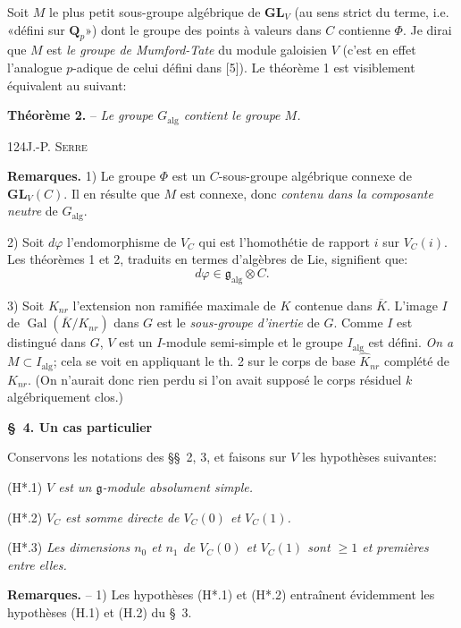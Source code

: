 Soit $M$ le plus petit sous-groupe algébrique de $\mathbf{GL}_V$ (au sens strict du terme, i.e. «défini sur $\mathbf Q_p$») dont le groupe des points à valeurs dans $C$ contienne $\Phi$. Je dirai que $M$ est \textit{le groupe de Mumford-Tate} du module galoisien $V$ (c'est en effet l'analogue $p$-adique de celui défini dans [5]). Le théorème 1 est visiblement équivalent au suivant:

\textbf{Théorème 2.} -- \textit{Le groupe $G_{\mathrm{alg}}$ contient le groupe $M$.}

124\hfill J.-P. \textsc{Serre}

\textbf{Remarques.} 1) Le groupe $\Phi$ est un $C$-sous-groupe algébrique connexe de $\mathbf{GL}_V(C)$. Il en résulte que $M$ est connexe, donc \textit{contenu dans la composante neutre} de $G_{\mathrm{alg}}$.

2) Soit $d\varphi$ l'endomorphisme de $V_C$ qui est l'homothétie de rapport $i$ sur $V_C(i)$. Les théorèmes 1 et 2, traduits en termes d'algèbres de Lie, signifient que:
\[
d\varphi\in\mathfrak g_{\mathrm{alg}}\otimes C.
\]

3) Soit $K_{nr}$ l'extension non ramifiée maximale de $K$ contenue dans $\overline K$. L'image $I$ de $\operatorname{Gal}(\overline K/K_{nr})$ dans $G$ est le \textit{sous-groupe d'inertie} de $G$. Comme $I$ est distingué dans $G$, $V$ est un $I$-module semi-simple et le groupe $I_{\mathrm{alg}}$ est défini. \textit{On a $M\subset I_{\mathrm{alg}}$}; cela se voit en appliquant le th. 2 sur le corps de base $\widehat K_{nr}$ complété de $K_{nr}$. (On n'aurait donc rien perdu si l'on avait supposé le corps résiduel $k$ algébriquement clos.)

\begin{center}\textbf{\S\ 4. Un cas particulier}\end{center}

Conservons les notations des \S\S\ 2, 3, et faisons sur $V$ les hypothèses suivantes:

(H*.1) \textit{$V$ est un $\mathfrak g$-module absolument simple.}

(H*.2) \textit{$V_C$ est somme directe de $V_C(0)$ et $V_C(1)$.}

(H*.3) \textit{Les dimensions $n_0$ et $n_1$ de $V_C(0)$ et $V_C(1)$ sont $\geq1$ et premières entre elles.}

\textbf{Remarques.} -- 1) Les hypothèses (H*.1) et (H*.2) entraînent évidemment les hypothèses (H.1) et (H.2) du \S\ 3.

